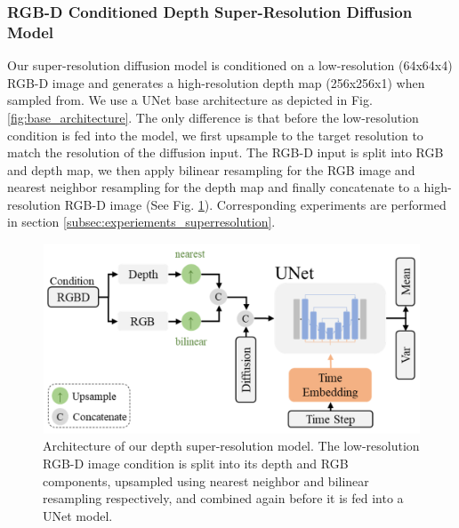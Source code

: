 \subsubsection{RGB-D Conditioned Depth Super-Resolution Diffusion Model} \label{subsubsec:rgbd_conditioned_depth_superresolution_diffusion_model}

Our super-resolution diffusion model is conditioned on a low-resolution (64x64x4) RGB-D image and generates a high-resolution depth map (256x256x1) when sampled from. We use a UNet base architecture as depicted in Fig. \ref{fig:base_architecture}. The only difference is that before the low-resolution condition is fed into the model, we first upsample to the target resolution to match the resolution of the diffusion input. The RGB-D input is split into RGB and depth map, we then apply bilinear resampling for the RGB image and nearest neighbor resampling for the depth map and finally concatenate to a high-resolution RGB-D image (See Fig. \ref{fig:superres_model}). 
Corresponding experiments are performed in section \ref{subsec:experiements_superresolution}.

\begin{figure}[t]
  \centering
  \includegraphics[width=0.99\linewidth]{illustrations/superres_model.png}
  \caption{Architecture of our depth super-resolution model. The low-resolution RGB-D image condition is split into its depth and RGB components, upsampled using nearest neighbor and bilinear resampling respectively, and combined again before it is fed into a UNet model.}
  \label{fig:superres_model}
\end{figure}

